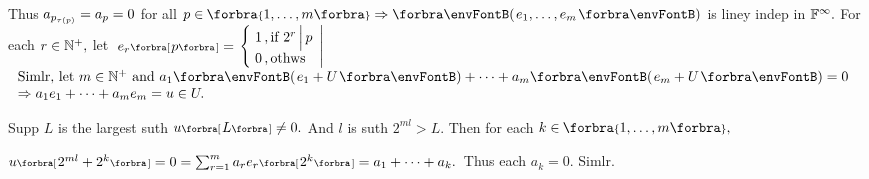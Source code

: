 Thus $a_{p_{\tau(\hspace{0pt}{p}\hspace{0pt})}}=a_p=0$ for all $p\in\;\!\!\Bra{1,\dots,m}\Rightarrow\Par{e_1,\dots,e_m}$ is liney indep in ${\mathbb{F}}^{\infty}.$\PfEnd\vspace{12pt}\quad
\Or For each $r\in{\mathbb{N}^+},$ let $\;e_r\Sbra{p}={}${\FontSmall$\hMath[0pt]{l}{\left\{\hspace{-2pt}}{\right|}{1\,,\text{if }2^r\,\Big|\,p\\0\,,\text{othws}}$}$\hText{$
	Simlr, let $m\in\Nbp$ and $a_1\Par{e_1+U}+\dots+a_m\Par{e_m+U}=0\\$
	$\Rightarrow a_1e_1+\dots+a_me_m=u\in U.$
	$}$\vspace{3pt}\par\quad
Supp $L$ is the largest suth $u\Sbra{L}\neq 0.$ And $l$ is suth $2^{ml}> L.$ \;Then for each $k\in\;\!\!\Bra{1,\dots,m},$\vspace{2pt}\par\quad
$u\Sbra{2^{ml}+2^k}=0=\sum_{r=1}^m a_re_r\Sbra{2^k}=a_1+\dots+a_k.$ \,Thus each $a_k=0.$ Simlr.\PfEnd
\SepLine
\ChEnd
\pagebreak


\vspace{4pt}

